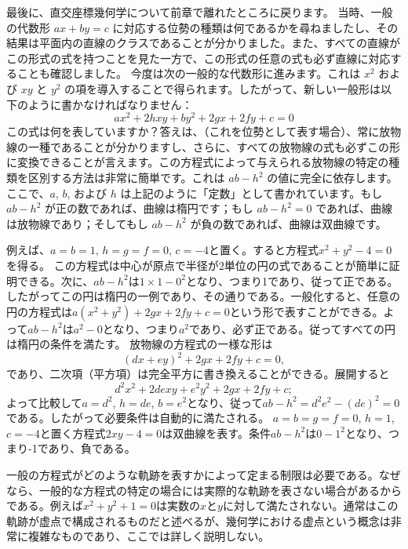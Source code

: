 \documentclass[a4paper,11pt,openany]{ltjsbook}
\begin{document}
最後に、直交座標幾何学について前章で離れたところに戻ります。
%
当時、一般の代数形 \(ax + by = c\) に対応する位勢の種類は何であるかを尋ねましたし、その結果は平面内の直線のクラスであることが分かりました。また、すべての直線がこの形式の式を持つことを見た一方で、この形式の任意の式も必ず直線に対応することも確認しました。
今度は次の一般的な代数形に進みます。これは \(x^2\) および \(xy\) と \(y^2\) の項を導入することで得られます。したがって、新しい一般形は以下のように書かなければなりません：
\[
ax^2 + 2hxy + by^2 + 2gx + 2fy + c = 0
\]
この式は何を表していますか？答えは、（これを位勢として表す場合）、常に放物線の一種であることが分かりますし、さらに、すべての放物線の式も必ずこの形に変換できることが言えます。この方程式によって与えられる放物線の特定の種類を区別する方法は非常に簡単です。これは \(ab - h^2\) の値に完全に依存します。ここで、\(a\), \(b\), および \(h\) は上記のように「定数」として書かれています。もし \(ab - h^2\) が正の数であれば、曲線は楕円です；もし \(ab - h^2 = 0\) であれば、曲線は放物線であり；そしてもし \(ab - h^2\) が負の数であれば、曲線は双曲線です。

例えば、$a = b = 1$, $h = g = f = 0$, $c = -4$と置く。すると方程式$x^{2} + y^{2} - 4 = 0$を得る。
この方程式は中心が原点で半径が2単位の円の式であることが簡単に証明できる。次に、$ab - h^{2}$は$1 \times 1 - 0^{2}$となり、つまり1であり、従って正である。したがってこの円は楕円の一例であり、その通りである。一般化すると、任意の円の方程式は$a(x^{2} + y^{2}) + 2gx + 2fy + c = 0$という形で表すことができる。よって$ab - h^{2}$は$a^{2} - 0$となり、つまり$a^{2}$であり、必ず正である。従ってすべての円は楕円の条件を満たす。
放物線の方程式の一様な形は
\[
(dx + ey)^{2} + 2gx + 2fy + c = 0,
\]
であり、二次項（平方項）は完全平方に書き換えることができる。展開すると
\[
d^{2} x^{2} + 2dexy + e^{2} y^{2} + 2gx + 2fy + c;
\]
よって比較して$a = d^{2}$, $h = de$, $b = e^{2}$となり、従って$ab - h^{2} = d^{2} e^{2} - (de)^{2} = 0$である。したがって必要条件は自動的に満たされる。
$a = b = g = f = 0$, $h = 1$, $c = -4$と置く方程式$2xy - 4 = 0$は双曲線を表す。条件$ab - h^{2}$は$0 - 1^{2}$となり、つまり-1であり、負である。

一般の方程式がどのような軌跡を表すかによって定まる制限は必要である。なぜなら、一般的な方程式の特定の場合には実際的な軌跡を表さない場合があるからである。例えば$x^{2} + y^{2} + 1 = 0$は実数の$x$と$y$に対して満たされない。通常はこの軌跡が虚点で構成されるものだと述べるが、幾何学における虚点という概念は非常に複雑なものであり、ここでは詳しく説明しない。
\end{document}
